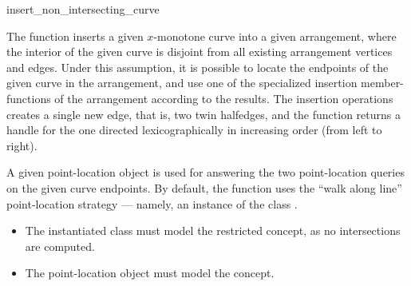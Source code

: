 \ccRefPageBegin

\begin{ccRefFunction}{insert_non_intersecting_curve}

\ccDefinition

The function \ccRefName{} inserts a given $x$-monotone curve into a given
arrangement, where the interior of the given curve is disjoint from all
existing arrangement vertices and edges. Under this assumption, it is
possible to locate the endpoints of the given curve in the arrangement,
and use one of the specialized insertion member-functions of the
arrangement according to the results. The insertion operations creates a
single new edge, that is, two twin halfedges, and the function returns a
handle for the one directed lexicographically in increasing order (from
left to right).

A given point-location object is used for answering the two point-location
queries on the given curve endpoints. By default, the function uses the
``walk along line'' point-location strategy --- namely, an instance of the
class .



\ccRequirements
\begin{itemize}
\item The instantiated  class must model the restricted
   concept, as no intersections are computed.
\item The point-location object  must model the
   concept. 
\end{itemize}

\end{ccRefFunction}

\ccRefPageEnd
